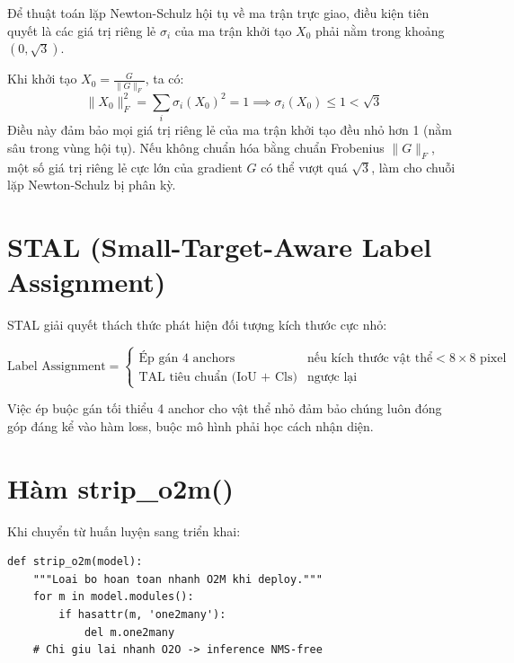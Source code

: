 \begin{notebox}
Để thuật toán lặp Newton-Schulz hội tụ về ma trận trực giao, điều kiện tiên quyết là các giá trị riêng lẻ $\sigma_i$ của ma trận khởi tạo $X_0$ phải nằm trong khoảng $(0, \sqrt{3})$.

Khi khởi tạo $X_0 = \frac{G}{\|G\|_F}$, ta có:
\[
\|X_0\|_F^2 = \sum_{i} \sigma_i(X_0)^2 = 1 \implies \sigma_i(X_0) \le 1 < \sqrt{3}
\]
Điều này đảm bảo mọi giá trị riêng lẻ của ma trận khởi tạo đều nhỏ hơn 1 (nằm sâu trong vùng hội tụ). Nếu không chuẩn hóa bằng chuẩn Frobenius $\|G\|_F$, một số giá trị riêng lẻ cực lớn của gradient $G$ có thể vượt quá $\sqrt{3}$, làm cho chuỗi lặp Newton-Schulz bị phân kỳ.
\end{notebox}

\section{STAL (Small-Target-Aware Label Assignment)}
\label{subsec:stal}

STAL giải quyết thách thức phát hiện đối tượng kích thước cực nhỏ:

\begin{equation}
    \text{Label Assignment} = \begin{cases}
        \text{Ép gán 4 anchors} & \text{nếu kích thước vật thể} < 8 \times 8 \text{ pixel} \\
        \text{TAL tiêu chuẩn (IoU + Cls)} & \text{ngược lại}
    \end{cases}
\end{equation}

Việc ép buộc gán tối thiểu 4 anchor cho vật thể nhỏ đảm bảo chúng luôn đóng góp đáng kể vào hàm loss, buộc mô hình phải học cách nhận diện.

\section{Hàm strip\_o2m()}
\label{subsec:strip_o2m}

Khi chuyển từ huấn luyện sang triển khai:

\begin{lstlisting}[caption={Loại bỏ nhánh O2M khi deploy}, label=lst:strip_o2m]
def strip_o2m(model):
    """Loai bo hoan toan nhanh O2M khi deploy."""
    for m in model.modules():
        if hasattr(m, 'one2many'):
            del m.one2many
    # Chi giu lai nhanh O2O -> inference NMS-free
\end{lstlisting}

